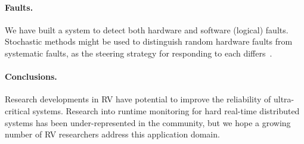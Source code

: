 \paragraph{Faults.}
We have built a system to detect both hardware and software (logical) faults.
Stochastic methods might be used to distinguish random hardware faults from
systematic faults, as the steering strategy for responding to each
differs~\cite{SammapunLS05}.

\paragraph{Conclusions.}
Research developments in RV have potential to improve the reliability of
ultra-critical systems.  Research into runtime monitoring for hard real-time
distributed systems has been under-represented in the community, but we hope a
growing number of RV researchers address this application domain.
